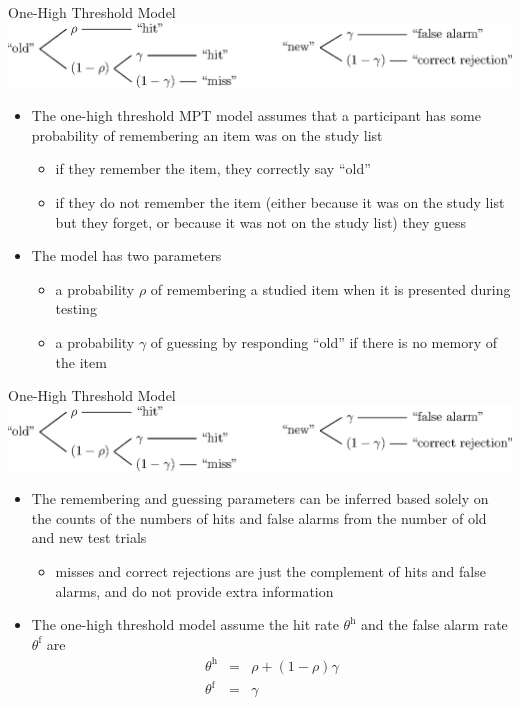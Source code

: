 \documentclass[10pt]{beamer}
\begin{document}
\begin{frame}[fragile]{One-High Threshold Model}
	\includegraphics[width = \textwidth]{oneHighThreshold.eps}
	\vspace{0.5em}
	\begin{itemize}
		\item The one-high threshold MPT model assumes that a participant has some probability of remembering an item was on the study list
		      \begin{itemize}
			      \item if they remember the item, they correctly say ``old''
			      \item if they do not remember the item (either because it was on the study list but they forget, or because it was not on the study list) they guess
		      \end{itemize}
		\item The model has two parameters
		      \begin{itemize}
			      \item a probability $\rho$ of remembering a studied item when it is presented during testing
			      \item a probability $\gamma$ of guessing by responding ``old'' if there is no memory of the item
		      \end{itemize}
	\end{itemize}
\end{frame}

\begin{frame}[fragile]{One-High Threshold Model}
	\includegraphics[width = \textwidth]{oneHighThreshold.eps}
	\vspace{0.5em}
	\begin{itemize}
		\item The remembering and guessing parameters can be inferred based solely on the counts of the numbers of hits and false alarms from the number of old and new test trials
		      \begin{itemize}
			      \item misses and correct rejections are just the complement of hits and false alarms, and do not provide extra information
		      \end{itemize}
		\item The one-high threshold model assume the hit rate $\theta^\mathrm{h}$ and the false alarm rate $\theta^\mathrm{f}$ are
		      \begin{eqnarray}
			      \theta^\mathrm{h} &=& \rho + \left(1-\rho\right)\gamma \nonumber\\
			      \theta^\mathrm{f} &=& \gamma \nonumber
		      \end{eqnarray}
	\end{itemize}
\end{frame}
\end{document}
